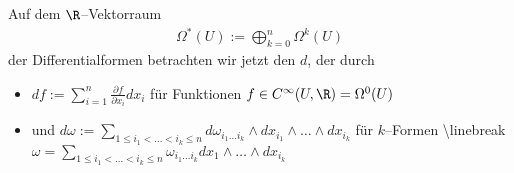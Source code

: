 \documentclass[letterpaper,10pt,english]{jupyterBook}
\begin{document}
\sphinxAtStartPar
Auf dem \(\R\)–Vektorraum
\begin{equation*}
\begin{split}\Omega^*(U) := \bigoplus_{k=0}^n\Omega^k(U)\end{split}
\end{equation*}
\sphinxAtStartPar
der Differentialformen betrachten wir jetzt
den  \(d\), der durch
\begin{itemize}
\item {} 
\sphinxAtStartPar
\(df := \sum_{i=1}^n\frac{\partial f}{\partial x_i}dx_i\) für Funktionen
\(f\in C^\infty(U,\R) = \Omega^0(U)\)

\item {} 
\sphinxAtStartPar
und \(d\omega := \sum_{1\leq i_1<\ldots<i_k\leq n}d\omega_{i_1\ldots i_k}
\wedge dx_{i_1}\wedge\ldots\wedge dx_{i_k}\) für \(k\)–Formen \textbackslash{}linebreak
\(\omega = \sum_{1\leq i_1<\ldots<i_k\leq n}\omega_{i_1\ldots i_k}
dx_1\wedge\ldots\wedge dx_{i_k}\)

\end{itemize}
\end{document}
